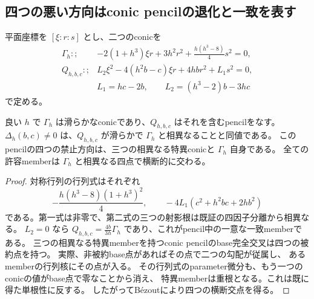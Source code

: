 \subsection{四つの悪い方向はconic pencilの退化と一致を表す}
\label{subsec:normal-order2-ramification}
平面座標を $[\xi:r:s]$ とし、二つのconicを
\begin{align*}
 \Gamma_h:;&-2(1+h^3)\xi r+3h^2r^2+\frac{h(h^3-8)}4s^2=0,\\
 Q_{h,b,c}:;&L_2\xi^2-4(h^2b-c)\xi r+4hbr^2+L_1s^2=0,\\
 &L_1=hc-2b,\qquad L_2=(h^3-2)b-3hc
\end{align*}
で定める。

\begin{proposition}
\label{prop:normal-order2-conic-pencil}
良い $h$ で $\Gamma_h$ は滑らかなconicであり、$Q_{h,b,c}$ はそれを含むpencilをなす。
$\Delta_h(b,c)\ne0$ は、$Q_{h,b,c}$ が滑らかで $\Gamma_h$ と相異なることと同値である。
このpencilの四つの禁止方向は、三つの相異なる特異conicと $\Gamma_h$ 自身である。
全ての許容memberは $\Gamma_h$ と相異なる四点で横断的に交わる。
\end{proposition}
\begin{proof}
対称行列の行列式はそれぞれ
\[
 -\frac{h(h^3-8)(1+h^3)^2}{4},\qquad
 -4L_1(c^2+h^2bc+2hb^2)
\]
である。第一式は非零で、第二式の三つの射影根は既証の四因子分離から相異なる。
$L_2=0$ なら $Q_{h,b,c}=\frac{4b}{3h}\Gamma_h$ であり、これがpencil中の一意な一致memberである。
三つの相異なる特異memberを持つconic pencilのbase完全交叉は四つの被約点を持つ。
実際、非被約base点があればその点で二つの勾配が従属し、
あるmemberの行列核にその点が入る。
その行列式のparameter微分も、もう一つのconicの値がbase点で零なことから消え、
特異memberは重根となる。これは既に得た単根性に反する。
したがってB\'ezoutにより四つの横断交点を得る。
\end{proof}


